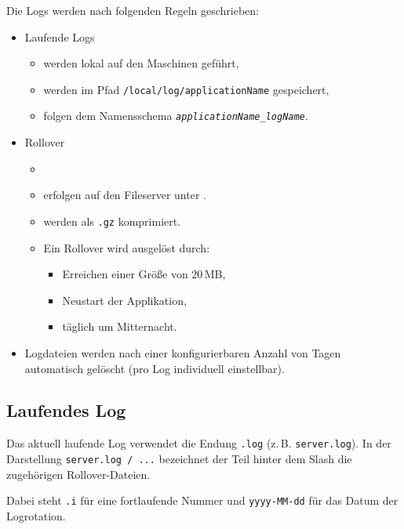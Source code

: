 Die Logs werden nach folgenden Regeln geschrieben:

\begin{itemize}
	\item Laufende Logs
	      \begin{itemize}
		      \item werden lokal auf den Maschinen geführt,
		      \item werden im Pfad \texttt{/local/log/applicationName} gespeichert,
		      \item folgen dem Namensschema \texttt{\textit{applicationName}\_\textit{logName}}.
	      \end{itemize}
	\item Rollover
	      \begin{itemize}
		      \item \item erfolgen auf den Fileserver unter .
		      \item werden als \texttt{.gz} komprimiert.
		      \item Ein Rollover wird ausgelöst durch:
		            \begin{itemize}
			            \item Erreichen einer Größe von 20\,MB,
			            \item Neustart der Applikation,
			            \item täglich um Mitternacht.
		            \end{itemize}
	      \end{itemize}
	\item Logdateien werden nach einer konfigurierbaren Anzahl von Tagen automatisch gelöscht (pro Log individuell einstellbar).
\end{itemize}

\subsection{Laufendes Log}

Das aktuell laufende Log verwendet die Endung \texttt{.log} (z.\,B. \texttt{server.log}).
In der Darstellung \texttt{server.log / ...} bezeichnet der Teil hinter dem Slash die zugehörigen Rollover-Dateien.

Dabei steht \texttt{.i} für eine fortlaufende Nummer und \texttt{yyyy-MM-dd} für das Datum der Logrotation.


\newenvironment{compactalltt}
{\footnotesize\ttfamily
	\setlength{\baselineskip}{0.9\baselineskip}
	\begin{alltt}}
		{\end{alltt}}

